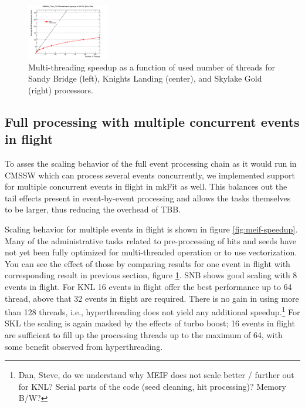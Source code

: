 \documentclass{webofc}
\def\mkfit{mkFit\xspace}
\def\threep{0.32\textwidth}
\def\postfigskip{\vskip-4mm}
\begin{document}
\begin{figure}[htb]
  \includegraphics[width=\threep]{figs/comp/SKL-SP_CMSSW_TTbar_PU70_TH_speedup.png}
  \postfigskip

  \caption{Multi-threading speedup as a function of used number of threads for Sandy
    Bridge (left), Knights Landing (center), and Skylake Gold (right) processors.}
  \label{fig:th-speedup}
\end{figure}


\subsection{Full processing with multiple concurrent events in flight}

To asses the scaling behavior of the full event processing chain as it would
run in CMSSW which can process several events concurrently, we implemented
support for multiple concurrent events in flight in \mkfit as well. This
balances out the tail effects present in event-by-event processing and allows
the tasks themselves to be larger, thus reducing the overhead of
TBB.

Scaling behavior for multiple events in flight is shown in figure
\ref{fig:meif-speedup}. Many of the administrative tasks related to
pre-processing of hits and seeds have not yet been fully optimized for
multi-threaded operation or to use vectorization. You can see the effect of
those by comparing results for one event in flight with corresponding result
in previous section, figure \ref{fig:th-speedup}. SNB shows good scaling with
8 events in flight. For KNL 16 events in flight offer the best performance up
to 64 thread, above that 32 events in flight are required. There is no gain in
using more than 128 threads, i.e., hyperthreading does not yield any
additional speedup.\footnote{Dan, Steve, do we understand why MEIF does not
  scale better / further out for KNL? Serial parts of the code (seed cleaning,
  hit processing)? Memory B/W?} For SKL the scaling is again masked by the
effects of turbo boost; 16 events in flight are sufficient to fill up the
processing threads up to the maximum of 64, with some benefit observed from
hyperthreading.
\end{document}
